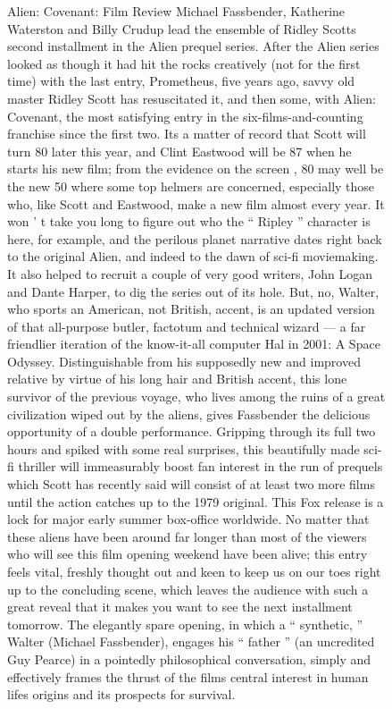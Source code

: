 \documentclass[../writeup.tex]{subfiles}
\begin{document}
\begin{figure}[h]
    {\small Alien: Covenant: Film Review Michael Fassbender, Katherine Waterston and Billy Crudup lead the ensemble of Ridley Scotts second installment in the Alien prequel series.
        After the Alien series looked as though it had hit the rocks creatively (not for the first time) with the last entry, Prometheus, five years ago, savvy old master Ridley Scott has resuscitated it, and then some, with Alien: Covenant, the most satisfying entry in the six-films-and-counting franchise since the first two.
        Its a matter of record that Scott will turn 80 later this year, and Clint Eastwood will be 87 when he starts his new film; from the evidence on the screen , 80 may well be the new 50 where some top helmers are concerned, especially those who, like Scott and Eastwood, make a new film almost every year.
        It won ’ t take you long to figure out who the “ Ripley ” character is here, for example, and the perilous planet narrative dates right back to the original Alien, and indeed to the dawn of sci-fi moviemaking.
        It also helped to recruit a couple of very good writers, John Logan and Dante Harper, to dig the series out of its hole.
        But, no, Walter, who sports an American, not British, accent, is an updated version of that all-purpose butler, factotum and technical wizard — a far friendlier iteration of the know-it-all computer Hal in 2001: A Space Odyssey.
        Distinguishable from his supposedly new and improved relative by virtue of his long hair and British accent, this lone survivor of the previous voyage, who lives among the ruins of a great civilization wiped out by the aliens, gives Fassbender the delicious opportunity of a double performance.
        Gripping through its full two hours and spiked with some real surprises, this beautifully made sci-fi thriller will immeasurably boost fan interest in the run of prequels which Scott has recently said will consist of at least two more films until the action catches up to the 1979 original.
        This Fox release is a lock for major early summer box-office worldwide. No matter that these aliens have been around far longer than most of the viewers who will see this film opening weekend have been alive; this entry feels vital, freshly thought out and keen to keep us on our toes right up to the concluding scene, which leaves the audience with such a great reveal that it makes you want to see the next installment tomorrow.
        The elegantly spare opening, in which a “ synthetic, ” Walter (Michael Fassbender), engages his “ father ” (an uncredited Guy Pearce) in a pointedly philosophical conversation, simply and effectively frames the thrust of the films central interest in human lifes origins and its prospects for survival.
}
\end{figure}
\end{document}
